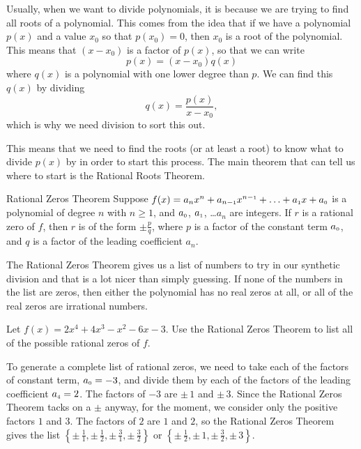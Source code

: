 Usually, when we want to divide polynomials, it is because we are trying to find all roots of a polynomial. This comes from the idea that if we have a polynomial $p(x)$ and a value $x_0$ so that $p(x_0) = 0$, then $x_0$ is a root of the polynomial. This means that $(x-x_0)$ is a factor of $p(x)$, so that we can write \[ p(x) = (x-x_0)q(x) \] where $q(x)$ is a polynomial with one lower degree than $p$. We can find this $q(x)$ by dividing
\[ q(x) = \frac{p(x)}{x-x_0}, \] which is why we need division to sort this out. 

This means that we need to find the roots (or at least a root) to know what to divide $p(x)$ by in order to start this process. The main theorem that can tell us where to start is the Rational Roots Theorem. 

\begin{theorem1}[RZT]{Rational Zeros Theorem} Suppose $f(x) = a_{n} x^{n} + a_{n-\mbox{\tiny$1$}}x^{n-\mbox{\tiny$1$}} + \ldots + a_{\mbox{\tiny$1$}} x + a_{\mbox{\tiny$0$}}$ is a polynomial of degree $n$ with $n \geq 1$, and $a_{\mbox{\tiny$0$}}$, $a_{\mbox{\tiny$1$}}$, \ldots $a_{n}$ are integers.  If $r$ is a rational zero of $f$, then $r$ is of the form $\pm \frac{p}{q}$, where $p$ is a factor of the constant term $a_{\mbox{\tiny$0$}}$, and $q$ is a factor of the leading coefficient $a_{n}$.  
\end{theorem1}

The Rational Zeros Theorem gives us a list of numbers to try in our synthetic division and that is a lot nicer than simply guessing.  If none of the numbers in the list are zeros, then either the polynomial has no real zeros at all, or all of the real zeros are irrational numbers.

\begin{example}  Let $f(x) = 2x^4+4x^3-x^2-6x-3$. Use the Rational Zeros Theorem to list all of the possible rational zeros of $f$.
\end{example}

\begin{exampleSol}To generate a complete list of rational zeros, we need to take each of the factors of constant term, $a_{\mbox{\tiny$0$}} = -3$, and divide them by each of the factors of the leading coefficient $a_{\mbox{\tiny$4$}} = 2$.  The factors of $-3$ are $\pm \, 1$ and $\pm \, 3$.  Since the Rational Zeros Theorem tacks on a $\pm$ anyway, for the moment, we consider only the positive factors $1$ and $3$.  The factors of $2$ are  $1$ and $2$, so the Rational Zeros Theorem gives the list $\left\{\pm \, \frac{1}{1}, \pm \, \frac{1}{2},  \pm \, \frac{3}{1}, \pm \, \frac{3}{2}\right\}$ or $\left\{\pm \, \frac{1}{2}, \pm \, 1, \pm \, \frac{3}{2}, \pm \, 3\right\}$.   
\label{RZTex}
\end{exampleSol}

